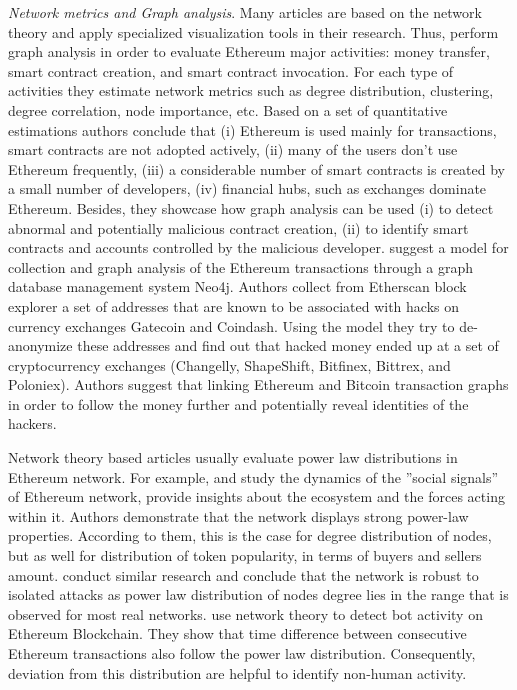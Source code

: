 \textit{Network metrics and Graph analysis}. Many articles are based on the network theory and apply specialized visualization tools in their research.
Thus, \cite{chen2018understanding} perform graph analysis in order to evaluate Ethereum major activities: money transfer, smart contract creation, and smart contract invocation. 
For each type of activities they estimate network metrics such as degree distribution, clustering, degree correlation, node importance, etc. 
Based on a set of quantitative estimations authors conclude that (i) Ethereum is used mainly for transactions, smart contracts are not adopted actively, (ii) many of the users don't use Ethereum frequently, (iii) a considerable number of smart contracts is created by a small number of developers, (iv) financial hubs, such as exchanges dominate Ethereum.
Besides, they showcase how graph analysis can be used (i) to detect abnormal and potentially malicious contract creation, (ii) to identify smart contracts and accounts controlled by the malicious developer.
\cite{chan2017Ethereum} suggest a model for collection and graph analysis of the Ethereum transactions through a graph database management system Neo4j. 
Authors collect from Etherscan block explorer a set of addresses that are known to be associated with hacks on currency exchanges Gatecoin and Coindash. 
Using the model they try to de-anonymize these addresses and find out that hacked money ended up at a set of cryptocurrency exchanges (Changelly, ShapeShift, Bitfinex, Bittrex, and Poloniex). 
Authors suggest that linking Ethereum and Bitcoin transaction graphs in order to follow the money further and potentially reveal identities of the hackers.

Network theory based articles usually evaluate power law distributions in Ethereum network.
For example, \cite{somin2018social} and \cite{somin2018network} study the dynamics of the ”social signals” of Ethereum network, provide insights about the ecosystem and the forces acting within it.
Authors demonstrate that the network displays strong power-law properties.
According to them, this is the case for degree distribution of nodes, but as well for distribution of token popularity, in terms of buyers and sellers amount.
\cite{anoaica2018quantitative} conduct similar research and conclude that the network is robust to isolated attacks as power law distribution of nodes degree lies in the range that is observed for most real networks.
\cite{zwang2018detecting} use network theory to detect bot activity on Ethereum Blockchain. 
They show that time difference between consecutive Ethereum transactions also follow the power law distribution.
Consequently, deviation from this distribution are helpful to identify non-human activity. 
 
